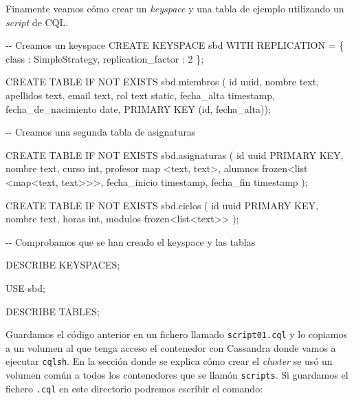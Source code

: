 \documentclass[
]{book}
\newenvironment{Shaded}{}{}
\newcommand{\NormalTok}[1]{#1}
\begin{document}
Finamente veamos cómo crear un \emph{keyspace} y una tabla de ejemplo utilizando un \emph{script} de CQL.

\begin{Shaded}
\begin{Highlighting}[]
\NormalTok{{-}{-} Creamos un keyspace}
\NormalTok{CREATE KEYSPACE sbd}
\NormalTok{  WITH REPLICATION = \{ \textquotesingle{}class\textquotesingle{} : \textquotesingle{}SimpleStrategy\textquotesingle{}, \textquotesingle{}replication\_factor\textquotesingle{} : 2 \};}

\NormalTok{CREATE TABLE IF NOT EXISTS sbd.miembros (}
\NormalTok{    id uuid,}
\NormalTok{    nombre text,}
\NormalTok{    apellidos text,}
\NormalTok{    email text,}
\NormalTok{    rol text static,}
\NormalTok{    fecha\_alta timestamp,}
\NormalTok{    fecha\_de\_nacimiento date,}
\NormalTok{    PRIMARY KEY (id, fecha\_alta));}

\NormalTok{{-}{-} Creamos una segunda tabla de asignaturas}

\NormalTok{CREATE TABLE IF NOT EXISTS sbd.asignaturas (}
\NormalTok{    id uuid PRIMARY KEY,}
\NormalTok{    nombre text,}
\NormalTok{    curso int,}
\NormalTok{    profesor map \textless{}text, text\textgreater{},}
\NormalTok{    alumnos frozen\textless{}list \textless{}map\textless{}text, text\textgreater{}\textgreater{}\textgreater{},}
\NormalTok{    fecha\_inicio timestamp,}
\NormalTok{    fecha\_fin timestamp}
\NormalTok{);}

\NormalTok{CREATE TABLE IF NOT EXISTS sbd.ciclos (}
\NormalTok{    id uuid  PRIMARY KEY,}
\NormalTok{    nombre text,}
\NormalTok{    horas int,}
\NormalTok{    modulos frozen\textless{}list\textless{}text\textgreater{}\textgreater{}}
\NormalTok{);}

\NormalTok{{-}{-} Comprobamos que se han creado el keyspace y las tablas}

\NormalTok{DESCRIBE KEYSPACES;}

\NormalTok{USE sbd;}

\NormalTok{DESCRIBE TABLES;}
\end{Highlighting}
\end{Shaded}

Guardamos el código anterior en un fichero llamado \texttt{script01.cql} y lo copiamos a un volumen al que tenga acceso el contenedor con Cassandra donde vamos a ejecutar \texttt{cqlsh}. En la sección donde se explica cómo crear el \emph{cluster} se usó un volumen común a todos los contenedores que se llamón \texttt{scripts}. Si guardamos el fichero \texttt{.cql} en este directorio podremos escribir el comando:
\end{document}
